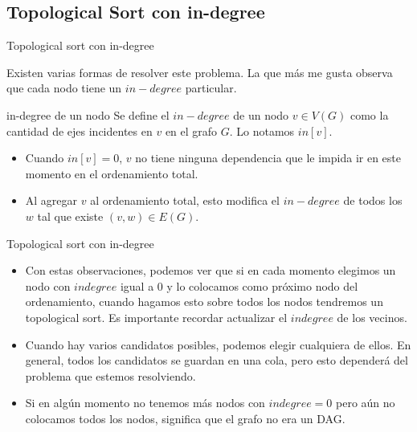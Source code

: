 \documentclass[compress]{beamer}
\begin{document}
\subsection{Topological Sort con in-degree}
\begin{frame}{Topological sort con in-degree}

Existen varias formas de resolver este problema. La que más me gusta
observa que cada nodo tiene un $in-degree$ particular.

\begin{block}{in-degree de un nodo}
Se define el $in-degree$ de un nodo $v \in V(G)$ como la cantidad de
ejes incidentes en $v$ en el grafo $G$. Lo notamos $in[v]$.
\end{block}

\begin{itemize}
\item Cuando $in[v] = 0$, $v$ no tiene ninguna dependencia que le impida ir
en este momento en el ordenamiento total. 
\item Al agregar $v$ al ordenamiento
total, esto modifica el $in-degree$ de todos los $w$ tal que existe $(v,w) \in E(G)$.
\end{itemize}

\end{frame}

\begin{frame}{Topological sort con in-degree}

\begin{itemize}
\item Con estas observaciones, podemos ver que si en cada momento elegimos un
nodo con $indegree$ igual a 0 y lo colocamos como próximo nodo del ordenamiento,
cuando hagamos esto sobre todos los nodos tendremos un topological sort.
Es importante recordar actualizar el $indegree$ de los vecinos.

\item Cuando hay varios candidatos posibles, podemos elegir cualquiera de ellos.
En general, todos los candidatos se guardan en una cola, pero esto dependerá 
del problema que estemos resolviendo.

\item Si en algún momento no tenemos más nodos con $indegree = 0$ pero aún no
colocamos todos los nodos, significa que el grafo no era un DAG.
\end{itemize}

\end{frame}
\end{document}
